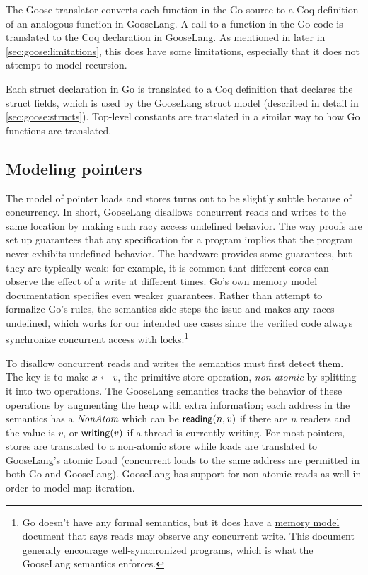 The Goose translator converts each function in the Go source to a Coq definition
of an analogous function in GooseLang. A call to a function  in the Go
code is translated to the  Coq declaration in GooseLang. As mentioned in
later in \cref{sec:goose:limitations}, this does have some limitations,
especially that it does not attempt to model recursion.

Each struct declaration in Go is translated to a Coq definition that declares
the struct fields, which is used by the GooseLang struct model (described in
detail in \cref{sec:goose:structs}). Top-level constants are translated in a
similar way to how Go functions are translated.

\subsection{Modeling pointers}%
\label{sec:goose:pointers}

The model of pointer loads and stores turns out to be slightly subtle because of
concurrency. In
short, GooseLang disallows concurrent reads and writes to the same
location by making such racy access undefined behavior. The way proofs are set
up guarantees that any
specification for a program implies that the
program never exhibits undefined behavior. The hardware provides some
guarantees, but they are typically weak: for example, it is common that
different cores can observe the effect of a write at different times. Go's own
memory model documentation specifies even weaker guarantees.  Rather than
attempt to formalize Go's rules, the semantics side-steps the issue and makes
any races undefined, which works for our intended use cases since the verified
code always synchronize concurrent access with locks.\footnote{Go doesn't have
any formal semantics, but it does have a \href{https://go.dev/ref/mem}{memory
model} document that says reads may observe any concurrent write. This document
generally encourage well-synchronized programs, which is what the GooseLang
semantics enforces.}

To disallow concurrent reads and writes the semantics must first detect them. The key is to make
$x \gets v$, the primitive store operation, \emph{non-atomic} by splitting it
into two operations. The GooseLang semantics tracks the behavior of these
operations by augmenting the heap with extra information; each address in the
semantics has a $\textit{NonAtom}$ which can be
$\mathsf{reading}(n, v)$ if there are $n$ readers and the value is $v$,
or $\mathsf{writing}(v)$ if a thread is currently writing. For most
pointers, stores are translated to a non-atomic store while loads are translated to
GooseLang's atomic Load (concurrent loads to the same address are permitted in
both Go and GooseLang). GooseLang has support for non-atomic
reads as well in order to model map iteration.

